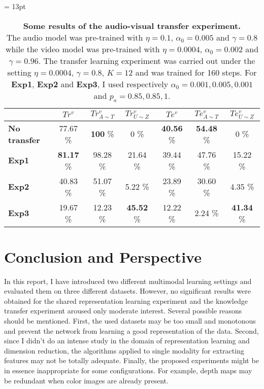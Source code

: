 \begin{table}[H]
  \tabcolsep = 13pt
  \caption{\textbf{Some results of the audio-visual transfer experiment.}
    \\[0.1em]
  The audio model was pre-trained with $\eta=0.1$, $\alpha_0=0.005$ and
  $\gamma=0.8$ while the video model was pre-trained with $\eta=0.0004$,
  $\alpha_0=0.002$ and $\gamma=0.96$. The transfer learning experiment
  was carried out under the setting $\eta=0.0004$, $\gamma=0.8$, $K=12$
  and was trained for 160 steps.
  For \textbf{Exp1}, \textbf{Exp2} and \textbf{Exp3}, I used respectively
  $\alpha_0 = 0.001, 0.005, 0.001$ and $p_a = 0.85, 0.85, 1$.
  }
  \label{tab:AVSR_transfer}
  \begin{tabular*}{\linewidth}{>{\bf}lcccccc}
    \toprule
    & $Tr^v$ & $Tr^v_{A\sim T}$ & $Tr^v_{U\sim Z}$
    & $Te^v$ & $Te^v_{A\sim T}$ & $Te^v_{U\sim Z}$\\
    \midrule
    No transfer & 77.67 \% & \textbf{100} \% & 0 \% & \textbf{40.56} \%
    & \textbf{54.48} \% & 0 \% \\
    Exp1 & \textbf{81.17} \% & 98.28 \% & 21.64 \% & 39.44 \%
    & 47.76 \% & 15.22 \% \\
    Exp2 &  40.83 \% & 51.07 \% & 5.22 \% & 23.89 \%
    & 30.60 \% & 4.35 \% \\
    Exp3 & 19.67 \% & 12.23 \% & \textbf{45.52} \% & 12.22 \%
    & 2.24 \% & \textbf{41.34} \% \\
    \bottomrule
  \end{tabular*}
\end{table}

\section{Conclusion and Perspective} \label{section:conclusion}

In this report, I have introduced two different multimodal learning
settings and evaluated them on three different datasets.
However, no significant results were obtained for the shared
representation learning experiment and the knowledge transfer experiment
aroused only moderate interest.
Several possible reasons should be mentioned.
First, the used datasets may be too small and monotonous and
prevent the network from learning a good representation of the data.
Second, since I didn't do an intense study in the domain of
representation learning and dimension reduction, the algorithms
applied to single modality for extracting features may not be totally
adequate. Finally, the proposed experiments might be in essence
inappropriate for some configurations. For example, depth maps may be
redundant when color images are already present.

